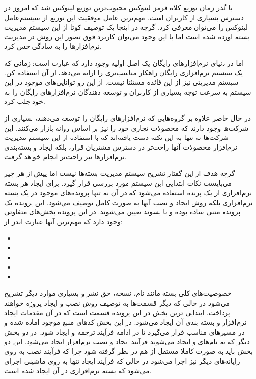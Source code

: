 با گذر زمان توزیع کلاه قرمز لینوکس محبوب‌ترین توزیع لینوکس شد که امروز در دسترس
بسیاری از کاربران است. مهم‌ترین عامل موفقیت این توزیع از سیستم‌عامل لینوکس را
می‌توان  معرفی کرد. گرچه در اینجا یک توصیف کوتا از این سیستم مدیریت بسته
اورده شده است اما با این وجود می‌توان کاربرد فوق تصور این روش در مدیریت
نرم‌افزارها را به سادگی حس کرد.

اما در دنیای نرم‌افزارهای رایگان یک اصل اولیه وجود دارد که عبارت است: زمانی که
یک سیستم نرم‌افزاری رایگان راهکار مناسب‌تری را ارائه می‌دهد، از آن استفاده کن.
سیستم مدیریتی  نیز از این قائده مستثنا نیست. از این رو توانایی‌های
موجود در این سیستم به سرعت توجه بسیاری از کاربران و توسعه دهندگان نرم‌افزارهای
رایگان را به خود جلب کرد.

در حال حاضر علاوه بر گروه‌هایی که نرم‌افزارهای رایگان  را توسعه می‌دهند، بسیاری
از شرکت‌ها وجود دارند که محصولات تجاری خود را نیز بر اساس  روانه بازار
می‌کنند. این شرکت‌ها نه تنها به این نکته دست یافته‌اند که با استفاده از این
سیستم مدیریت نرم‌افزار محصولات آنها راحت‌تر در دسترس مشتریان قرار،
بلکه ایجاد و بسته‌بندی نرم‌افزارها نیز راحت‌تر انجام خواهد گرفت.

گرچه هدف از این گفتار تشریح سیستم مدیریت بسته‌ها نیست اما پیش از هر چیر می‌بایست
نکات ابتدایی این سیستم مورد بررسی قرار گیرد. برای ایجاد هر بسته نرم‌افزاری از یک
پرنده استفاده می‌شود که در آن نه تنها پرونده‌های موجود در یک بسته نرم‌افزاری
بلکه روش ایجاد و نصب آنها به صورت کامل توصیف می‌شود. این پرونده یک پرونده متنی
ساده بوده و با پسوند  تعیین می‌شوند. در این پرونده بخش‌های متفاوتی وجود
دارد که مهم‌ترین آنها عبارت اندز از:

\begin{itemize}
  \item {}
  \item {}
  \item {}
  \item {}
  \item {}
\end{itemize}

 خصوصیت‌های کلی بسته مانند نام، نسخه، حق نشر و بسیاری موارد دیگر
تشریح می‌شود در حالی که دیگر قسمت‌ها به توصیف روش نصب و ایجاد پروژه خواهند
پرداخت. ابتدایی ترین بخش در این پرونده قسمت  است که در آن مقدمات ایجاد
نرم‌افزار و بسته بندی آن ایجاد می‌شود. در این بخش کدهای منبع موجود اماده شده و
در مسیرهای مناسب قرار می‌گیرد تا در ادامه فرآیند ترجمه و ایجاد شود. در دو بخش
دیگر که به نام‌های  و  ایجاد می‌شوند فرآیند ایجاد و نصب
نرم‌افزار ایجاد می‌شود. این دو بخش باید به صورت کاملا مستقل از هم در نظر گرفته
شود چرا که فرآیند نصب به روی رایانه‌های دیگر نیز اجرا می‌شود در حالی که فرآیند
ایجاد تنها به روی ماشینی اجرای می‌شود که بسته نرم‌افزاری در آن ایجاد شده است.


